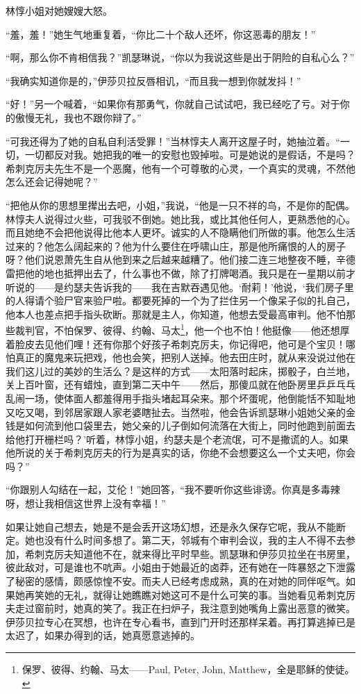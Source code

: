 \par 林惇小姐对她嫂嫂大怒。
\par “羞，羞！”她生气地重复着，“你比二十个敌人还坏，你这恶毒的朋友！”
\par “啊，那么你不肯相信我？”凯瑟琳说，“你以为我说这些是出于阴险的自私心么？”
\par “我确实知道你是的，”伊莎贝拉反唇相讥，“而且我一想到你就发抖！”
\par “好！”另一个喊着，“如果你有那勇气，你就自己试试吧，我已经吃了亏。对于你的傲慢无礼，我也不跟你辩了。”
\par “可我还得为了她的自私自利活受罪！”当林惇夫人离开这屋子时，她抽泣着。“一切，一切都反对我。她把我的唯一的安慰也毁掉啦。可是她说的是假话，不是吗？希刺克厉夫先生不是一个恶魔，他有一个可尊敬的心灵，一个真实的灵魂，不然他怎么还会记得她呢？”
\par “把他从你的思想里撵出去吧，小姐，”我说，“他是一只不祥的鸟，不是你的配偶。林惇夫人说得过火些，可我驳不倒她。她比我，或比其他任何人，更熟悉他的心。而且她绝不会把他说得比他本人更坏。诚实的人不隐瞒他们所做的事。他怎么生活过来的？他怎么阔起来的？他为什么要住在呼啸山庄，那是他所痛恨的人的房子呀？他们说恩萧先生自从他到来之后越来越糟了。他们接二连三地整夜不睡，辛德雷把他的地也抵押出去了，什么事也不做，除了打牌喝酒。我只是在一星期以前才听说的——是约瑟夫告诉我的——我在吉默吞遇见他。‘耐莉！’他说，‘我们房子里的人得请个验尸官来验尸啦。都要死掉的一个为了拦住另一个像呆子似的扎自己，他本人也差点把手指头砍断。那就是主人，你知道，他想去受最高审判。他不怕那些裁判官，不怕保罗、彼得、约翰、马太\footnote{保罗、彼得、约翰、马太——Paul, Peter, John, Matthew，全是耶稣的使徒。}，他一个也不怕！他挺像——他还想厚着脸皮去见他们哩！还有你那个好孩子希刺克厉夫，你记得吧，他可是个宝贝！哪怕真正的魔鬼来玩把戏，他也会笑，把别人送掉。他去田庄时，就从来没说过他在我们这儿过的美妙的生活么？是这样的方式——太阳落时起床，掷骰子，白兰地，关上百叶窗，还有蜡烛，直到第二天中午——然后，那傻瓜就在他卧房里乒乒乓乓乱闹一场，使体面人都羞得用手指头堵起耳朵来。那个坏蛋呢，他倒能恬不知耻地又吃又喝，到邻居家跟人家老婆瞎扯去。当然啦，他会告诉凯瑟琳小姐她父亲的金钱是如何流到他口袋里去，她父亲的儿子倒如何流落在大街上，同时他跑到前面去给他打开栅栏吗？’听着，林惇小姐，约瑟夫是个老流氓，可不是撒谎的人。如果他所说的关于希刺克厉夫的行为是真实的话，你绝不会想要这么一个丈夫吧，你会吗？”
\par “你跟别人勾结在一起，艾伦！”她回答，“我不要听你这些诽谤。你真是多毒辣呀，想让我相信这世界上没有幸福！”
\par 如果让她自己想去，她是不是会丢开这场幻想，还是永久保存它呢，我从不能断定。她也没有什么时间多想了。第二天，邻城有个审判会议，我的主人不得不去参加，希刺克厉夫知道他不在，就来得比平时早些。凯瑟琳和伊莎贝拉坐在书房里，彼此敌对，可是谁也不吭声。小姐由于她最近的卤莽，还有她在一阵暴怒之下泄露了秘密的感情，颇感惊惶不安。而夫人已经考虑成熟，真的在对她的同伴呕气。如果她再笑她的无礼，就得让她瞧瞧对她这可不是什么可笑的事。当她看见希刺克厉夫走过窗前时，她真的笑了。我正在扫炉子，我注意到她嘴角上露出恶意的微笑。伊莎贝拉专心在冥想，也许在专心看书，直到门开时还那样呆着。再打算逃掉已是太迟了，如果办得到的话，她真愿意逃掉的。
